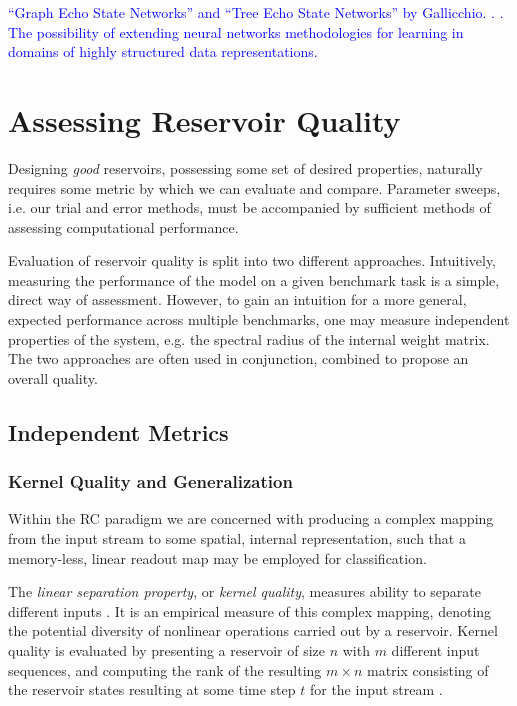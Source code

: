 \textcolor{blue}{
  ``Graph Echo State Networks'' and ``Tree Echo State Networks'' by
Gallicchio. \cite{gallicchio_tree_2013}. \cite{gallicchio_graph_2010}. The
possibility of extending neural networks methodologies for learning in domains
of highly structured data representations.
}

\section{Assessing Reservoir Quality}

Designing \textit{good} reservoirs, possessing some set of desired properties,
naturally requires some metric by which we can evaluate and compare. Parameter
sweeps, i.e. our trial and error methods, must be accompanied by sufficient
methods of assessing computational performance.

Evaluation of reservoir quality is split into two different
approaches. Intuitively, measuring the performance of the model on a given
benchmark task is a simple, direct way of assessment. However, to gain an
intuition for a more general, expected performance across multiple benchmarks,
one may measure independent properties of the system, e.g. the spectral radius
of the internal weight matrix. The two approaches are often used in conjunction,
combined to propose an overall quality.

\subsection{Independent Metrics}

\subsubsection{Kernel Quality and Generalization}

Within the RC paradigm we are concerned with producing a complex mapping from
the input stream to some spatial, internal representation, such that a
memory-less, linear readout map may be employed for classification.

The \textit{linear separation property}, or \textit{kernel quality}, measures
ability to separate different inputs \cite{legenstein_edge_2007}. It is an
empirical measure of this complex mapping, denoting the potential diversity of
nonlinear operations carried out by a reservoir. Kernel quality is evaluated by
presenting a reservoir of size $n$ with $m$ different input sequences, and
computing the rank of the resulting $m\times n$ matrix consisting of the
reservoir states resulting at some time step $t$ for the input stream
\cite{busing_connectivity_2010}.

